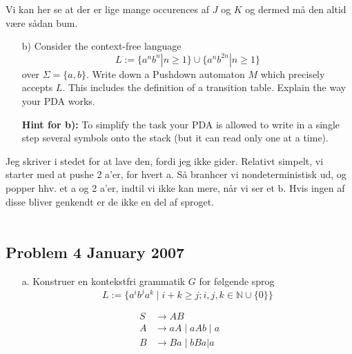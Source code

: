 Vi kan her se at der er lige mange occurences af $J$ og $K$ og dermed må den altid være sådan bum.

\begin{enumerate}
    \item[b)] Consider the context-free language
    \[
    L := \{a^n b^n | n \geq 1\} \cup \{a^n b^{2n} | n \geq 1\}
    \]
    over \( \Sigma = \{a, b\} \).
    Write down a Pushdown automaton \( M \) which precisely accepts \( L \). This includes the definition of a transition table. Explain the way your PDA works.

    \textbf{Hint for b):} To simplify the task your PDA is allowed to write in a single step several symbols onto the stack (but it can read only one at a time).
\end{enumerate}

Jeg skriver i stedet for at lave den, fordi jeg ikke gider. Relativt simpelt, vi starter med at pushe 2 a'er, for hvert a. Så branhcer vi nondeterministisk ud, og popper hhv. et a og 2 a'er, indtil vi ikke kan mere, når vi ser et b. Hvis ingen af disse bliver genkendt er de ikke en del af sproget.\\\\

\noindent
\subsection*{Problem 4 January 2007}
\noindent

\begin{enumerate}
  \item[a.] Konstruer en kontekstfri grammatik $G$ for følgende sprog
        \[L := \{a^{i}b^{j}a^{k} \mid i+k \ge j; i,j,k \in \mathbb{N} \cup \{0\}\}\]
\end{enumerate}

\begin{equation*}
\begin{split}
  S &\rightarrow AB\\
  A &\rightarrow aA \mid aAb \mid a \\
  B &\rightarrow Ba \mid bBa | a \\
\end{split}
\end{equation*}

